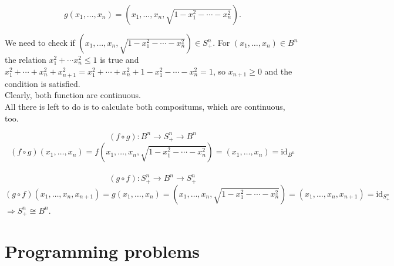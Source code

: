 \documentclass[a4paper,11pt]{article}
\begin{document}
$$ g(x_1, \ldots, x_n) = \left( x_1, \ldots, x_n, \sqrt{ 1 - x_1^2 - \cdots - x_n^2} \right). $$

\noindent
We need to check if $\left( x_1, \ldots, x_n, \sqrt{ 1 - x_1^2 - \cdots - x_n^2} \right) \in S_{+}^{n}$. For $(x_1, \ldots, x_n) \in B^n$ the relation $x_1^2 + \cdots x_n^2 \leq 1 $ is true and $x_1^2 + \cdots + x_n^2 + x_{n + 1}^2 = x_1^2 + \cdots + x_n^2 + 1 - x_1^2 - \cdots - x_n^2 = 1$, so $x_{n+1} \geq 0$ and the condition is satisfied.
\\
Clearly, both function are continuous. 
\\
All there is left to do is to calculate both compositums, which are continuous, too.

$$ (f \circ g): B^n \to S_{+}^{n} \to B^n $$
$$ (f \circ g)(x_1, \ldots, x_n) = f \left(x_1, \ldots, x_n, \sqrt{ 1 - x_1^2 - \cdots - x_n^2} \right) = (x_1, \ldots, x_n) = \text{id}_{B^n}$$
\\
$$ (g \circ f): S_{+}^{n} \to B^n \to S_{+}^{n} $$
$$ (g \circ f)(x_1, \ldots, x_n, x_{n + 1}) = g(x_1, \ldots, x_n) = \left(x_1, \ldots, x_n, \sqrt{ 1 - x_1^2 - \cdots - x_n^2} \right) = (x_1, \ldots, x_n, x_{n + 1}) = \text{id}_{S_{+}^{n}}$$
\noindent
$ \Longrightarrow S_{+}^{n} \cong B^n.$

\section{Programming problems}
\end{document}
